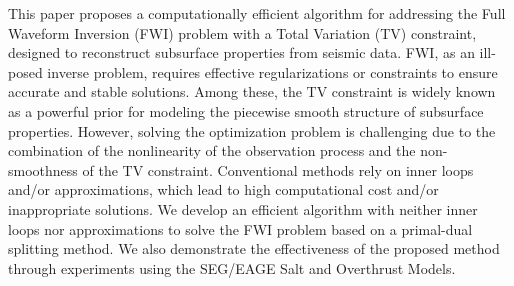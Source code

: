 This paper proposes a computationally efficient algorithm for addressing the Full Waveform Inversion (FWI) problem with a Total Variation (TV) constraint, designed to reconstruct subsurface properties from seismic data.
FWI, as an ill-posed inverse problem, requires effective regularizations or constraints to ensure accurate and stable solutions.
Among these, the TV constraint is widely known as a powerful prior for modeling the piecewise smooth structure of subsurface properties.
However, solving the optimization problem is challenging due to the combination of the nonlinearity of the observation process and the non-smoothness of the TV constraint.
Conventional methods rely on inner loops and/or approximations, which lead to high computational cost and/or inappropriate solutions.
We develop an efficient algorithm with neither inner loops nor approximations to solve the FWI problem based on a primal-dual splitting method.
We also demonstrate the effectiveness of the proposed method through experiments using the SEG/EAGE Salt and Overthrust Models.
